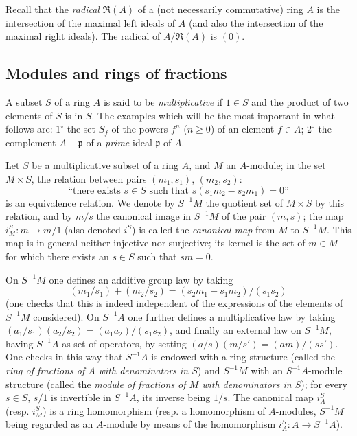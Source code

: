 \begin{env}[1.1.2]
\label{0.1.1.2}
Recall that the \emph{radical} $\mathfrak{R}(A)$ of a (not necessarily commutative) ring $A$ is the intersection of the maximal left ideals of $A$ (and also the intersection of the maximal right ideals).
The radical of $A/\mathfrak{R}(A)$ is $(0)$.
\end{env}

\subsection{Modules and rings of fractions}
\label{subsection:0.1.2}

\begin{env}[1.2.1]
\label{0.1.2.1}
A subset $S$ of a ring $A$ is said to be \emph{multiplicative} if $1\in S$ and the product of two elements of $S$ is in $S$.
The examples which will be the most important in what follows are: $1^\circ$ the set $S_f$ of the powers $f^n$ ($n\geq 0$) of an element $f\in A$; $2^\circ$ the complement $A-\mathfrak{p}$ of a \emph{prime} ideal $\mathfrak{p}$ of $A$.
\end{env}

\begin{env}[1.2.2]
\label{0.1.2.2}
Let $S$ be a multiplicative subset of a ring $A$, and $M$ an $A$-module; in the set $M\times S$, the relation between pairs $(m_1,s_1)$, $(m_2,s_2)$:
\[
  \text{``there exists $s\in S$ such that $s(s_1m_2-s_2m_1)=0$''}
\]
is an equivalence relation.
We denote by $S^{-1}M$ the quotient set of $M\times S$ by this relation, and by $m/s$ the canonical image in $S^{-1}M$ of the pair $(m,s)$; the map $i_M^S:m\mapsto m/1$ (also denoted $i^S$) is called the \emph{canonical map} from $M$ to $S^{-1}M$.
This map is in general neither injective nor surjective; its kernel is the set of $m\in M$ for which there exists an $s\in S$ such that $sm=0$.

On $S^{-1}M$ one defines an additive group law by taking
\[
  (m_1/s_1)+(m_2/s_2)=(s_2m_1+s_1m_2)/(s_1s_2)
\]
(one checks that this is indeed independent of the expressions of the elements of $S^{-1}M$ considered).
On $S^{-1}A$ one further defines a multiplicative law by taking $(a_1/s_1)(a_2/s_2)=(a_1a_2)/(s_1s_2)$, and finally an external law on $S^{-1}M$, having $S^{-1}A$ as set of operators, by setting $(a/s)(m/s')=(am)/(ss')$.
One checks in this way that $S^{-1}A$ is endowed with a ring structure (called the \emph{ring of fractions of $A$ with denominators in $S$}) and $S^{-1}M$ with an $S^{-1}A$-module structure (called the \emph{module of fractions of $M$ with denominators in $S$}); for every $s\in S$, $s/1$ is invertible in $S^{-1}A$, its inverse being $1/s$.
The canonical map $i_A^S$ (resp. $i_M^S$) is a ring homomorphism (resp. a homomorphism of $A$-modules, $S^{-1}M$ being regarded as an $A$-module by means of the homomorphism $i_A^S:A\to S^{-1}A$).
\end{env}

